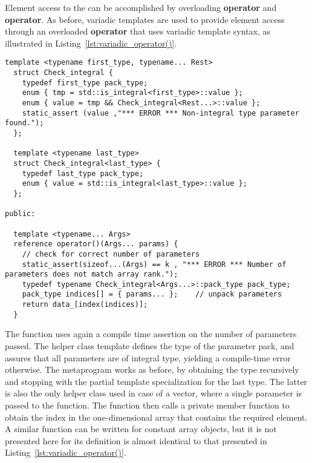 \documentclass[11pt]{article}
\newcommand{\code}[1]{{\footnotesize\ttfamily{#1}}}
\newcommand\keywordd[1]{{\color{DarkOrchid}\footnotesize\ttfamily\textbf{#1}}}
\begin{document}
Element access to the \code{Array} can be accomplished by overloading \keywordd{operator}\code{()} and \keywordd{operator}\code{[]}.
As before, variadic templates are used to provide element access through an overloaded \keywordd{operator}\code{()} that uses variadic template syntax, as illustrated in Listing~\ref{lst:variadic_operator()}.
\begin{lstlisting}[caption={Variadic template \code{operator()}}, label=lst:variadic_operator()]
  template <typename first_type, typename... Rest>
  struct Check_integral {
    typedef first_type pack_type;
    enum { tmp = std::is_integral<first_type>::value };
    enum { value = tmp && Check_integral<Rest...>::value };
    static_assert (value ,"*** ERROR *** Non-integral type parameter found.");
  };
  
  template <typename last_type>
  struct Check_integral<last_type> {
    typedef last_type pack_type;
    enum { value = std::is_integral<last_type>::value };
  };
  
public:    

  template <typename... Args>
  reference operator()(Args... params) {
    // check for correct number of parameters
    static_assert(sizeof...(Args) == k , "*** ERROR *** Number of parameters does not match array rank.");
    typedef typename Check_integral<Args...>::pack_type pack_type;
    pack_type indices[] = { params... };	// unpack parameters
    return data_[index(indices)];
  }
\end{lstlisting}
The function uses again a compile time assertion on the number of parameters passed. The helper class template \code{Check\_integral} defines the type of the parameter pack, and assures that all parameters are of integral type, yielding a compile-time error otherwise. The metaprogram works as before, by obtaining the type recursively and stopping with the partial template specialization for the last type. The latter is also the only helper class used in case of a vector, where a single parameter is passed to the function.
The function then calls a private member function to obtain the index in the one-dimensional array that contains the required element.
A similar function can be written for constant array objects, but it is not presented here for its definition is almost identical to that presented in Listing~\ref{lst:variadic_operator()}.
\end{document}

